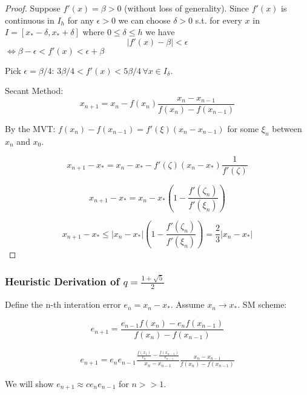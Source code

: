 \begin{proof} 
    Suppose $f'(x) = \beta > 0$ (without loss of generality). Since $f'(x)$ is continuous in $I_h$ for any $\epsilon > 0$ we can choose $\delta>0$ s.t. for every $x$ in $I=[x_*-\delta,x_*+\delta]$ where $0\leq \delta\leq h$ we have
    \[|f'(x) - \beta| < \epsilon\]
    $\Leftrightarrow  \beta - \epsilon < f'(x) < \epsilon + \beta$

    Pick $\epsilon=\beta/4$: $3\beta/4 < f'(x) < 5\beta/4\, \forall x\in I_\delta$.

    Secant Method: 
    \[x_{n+1} = x_n - f(x_n)\frac{x_n - x_{n-1}}{f(x_n)-f(x_{n-1})}\]

    By the MVT: $f(x_n)-f(x_{n-1}) = f'(\xi)(x_n-x_{n-1})$ for some $\xi_n$ between $x_n$ and $x_0$.

    \begin{equation} 
        x_{n+1} - x_* = x_n - x_* - f'(\zeta)(x_n - x_*)\frac{1}{f'(\zeta)}
    \end{equation}

    \begin{equation} 
        x_{n+1} - x_* = x_n - x_* \left(1-\frac{f'(\zeta_n)}{f'(\xi_n)}\right)
    \end{equation}

    \begin{equation} 
        x_{n+1} - x_* \leq |x_n - x_*| \left(1-\frac{f'(\zeta_n)}{f'(\xi_n)}\right) = \frac{2}{3} |x_n-x_*|
    \end{equation}
\end{proof}

\subsubsection{Heuristic Derivation of $q=\frac{1+\sqrt{5}}{2}$}

Define the n-th interation error $e_n=x_n-x_*$. Assume $x_n \rightarrow x_*$. SM scheme: 

\[e_{n+1} = \frac{e_{n-1}f(x_n) - e_nf(x_{n-1})}{f(x_n)-f(x_{n-1})}\]

\begin{align}
    e_{n+1} = e_ne_{n-1}\frac{\frac{f(x_1)}{e_n}- \frac{f(x_{n-1})}{e_{n-1}}}{x_n - x_{n-1}} \frac{x_n-x_{n-1}}{f(x_n)-f(x_{n-1})} \label{eq1}
\end{align}

We will show $e_{n+1} \approx ce_ne_{n-1}$ for $n>>1$.

